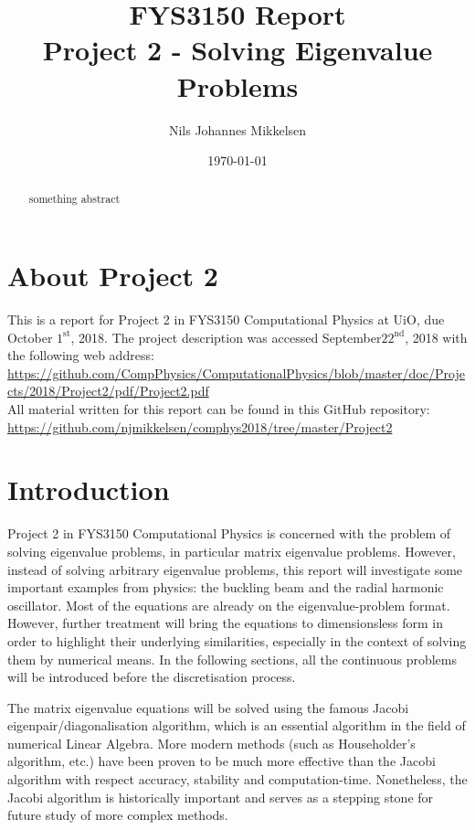 \documentclass[reprint,english]{revtex4-1}
\begin{document}
\title{FYS3150 Report\\Project 2 - Solving Eigenvalue Problems}
\author{Nils Johannes Mikkelsen}
\date{\today}
\noaffiliation
\begin{abstract}
something abstract
\end{abstract}
\maketitle

\section*{About Project 2}
This is a report for Project 2 in FYS3150 Computational Physics at UiO, due October \(1^{\text{st}}\), 2018. \cite{project2} The project description was accessed September\(22^{\text{nd}}\), 2018 with the following web address:\\
{\scriptsize\url{https://github.com/CompPhysics/ComputationalPhysics/blob/master/doc/Projects/2018/Project2/pdf/Project2.pdf}}\\
All material written for this report can be found in this GitHub repository:\\
{\scriptsize\url{https://github.com/njmikkelsen/comphys2018/tree/master/Project2}}
\section{Introduction}
Project 2 in FYS3150 Computational Physics is concerned with the problem of solving eigenvalue problems, in particular matrix eigenvalue problems. However, instead of solving arbitrary eigenvalue problems, this report will investigate some important examples from physics: the buckling beam and the radial harmonic oscillator. Most of the equations are already on the eigenvalue-problem format. However, further treatment will bring the equations to dimensionsless form in order to highlight their underlying similarities, especially in the context of solving them by numerical means. In the following sections, all the continuous problems will be introduced before the discretisation process.

The matrix eigenvalue equations will be solved using the famous Jacobi eigenpair/diagonalisation algorithm, which is an essential algorithm in the field of numerical Linear Algebra. More modern methods (such as Householder's algorithm, etc.) have been proven to be much more effective than the Jacobi algorithm with respect accuracy, stability and computation-time. Nonetheless, the Jacobi algorithm is historically important and serves as a stepping stone for future study of more complex methods.
\end{document}
